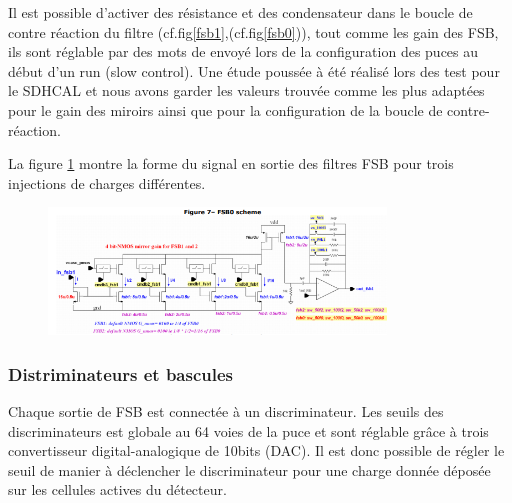 Il est possible d'activer des résistance et des condensateur dans le boucle de contre réaction du filtre (cf.fig\ref{fsb1},(cf.fig\ref{fsb0})), tout comme les gain des FSB, ils sont réglable par des mots de envoyé lors de la configuration des puces au début d'un run (slow control). Une étude poussée à été réalisé lors des test pour le SDHCAL et nous avons garder les valeurs trouvée comme les plus adaptées pour le gain des miroirs ainsi que pour la configuration de la boucle de contre-réaction.

La figure \ref{signal} montre la forme du signal en sortie des filtres FSB pour trois injections de charges différentes.
\begin{figure}[h!]
	\centering
	\includegraphics[width=0.8\textwidth]{GLA/FSB1.png}
	\label{signal}
\end{figure}

\subsubsection{Distriminateurs et bascules}
Chaque sortie de FSB est connectée à un discriminateur. Les seuils des discriminateurs est globale au 64 voies de la puce et sont réglable grâce à trois convertisseur digital-analogique de 10bits (DAC). Il est donc possible de régler le seuil de manier à déclencher le discriminateur pour une charge donnée déposée sur les cellules actives du détecteur.

